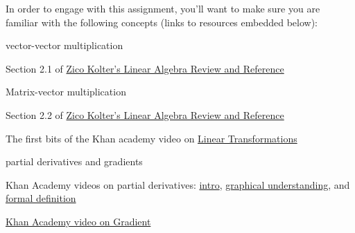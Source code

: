 \documentclass[assignment02_Solutions]{subfiles}
\begin{document}
\begin{recall}
In order to engage with this assignment, you'll want to make sure you are familiar with the following concepts (links to resources embedded below):
\bi
\item vector-vector multiplication
\bi
\item Section 2.1 of \href{https://see.stanford.edu/materials/aimlcs229/cs229-linalg.pdf}{Zico Kolter's Linear Algebra Review and Reference}
\ei
\item Matrix-vector multiplication
\bi
\item Section 2.2 of \href{https://see.stanford.edu/materials/aimlcs229/cs229-linalg.pdf}{Zico Kolter's Linear Algebra Review and Reference}
\item The first bits of the Khan academy video on \href{https://www.khanacademy.org/math/linear-algebra/matrix-transformations/linear-transformations/v/matrix-vector-products-as-linear-transformations}{Linear Transformations}
\ei
\item partial derivatives and gradients
\bi
\item Khan Academy videos on partial derivatives: \href{https://www.khanacademy.org/math/multivariable-calculus/multivariable-derivatives/partial-derivatives/v/partial-derivatives-introduction}{intro}, \href{https://www.khanacademy.org/math/multivariable-calculus/multivariable-derivatives/partial-derivatives/v/partial-derivatives-and-graphs}{graphical understanding}, and \href{https://www.khanacademy.org/math/multivariable-calculus/multivariable-derivatives/partial-derivatives/v/formal-definition-of-partial-derivatives}{formal definition}
\item \href{https://www.khanacademy.org/math/multivariable-calculus/multivariable-derivatives/gradient-and-directional-derivatives/v/gradient}{Khan Academy video on Gradient}
\ei
\ei
\end{recall}
\end{document}
